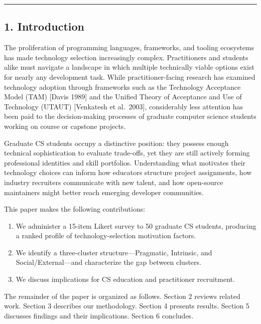 \documentclass[
]{article}
\providecommand{\tightlist}{%
  \setlength{\itemsep}{0pt}\setlength{\parskip}{0pt}}
\begin{document}
\begin{center}\rule{0.5\linewidth}{0.5pt}\end{center}

\subsection{1. Introduction}\label{introduction}

The proliferation of programming languages, frameworks, and tooling
ecosystems has made technology selection increasingly complex.
Practitioners and students alike must navigate a landscape in which
multiple technically viable options exist for nearly any development
task. While practitioner-facing research has examined technology
adoption through frameworks such as the Technology Acceptance Model
(TAM) {[}Davis 1989{]} and the Unified Theory of Acceptance and Use of
Technology (UTAUT) {[}Venkatesh et al.~2003{]}, considerably less
attention has been paid to the decision-making processes of graduate
computer science students working on course or capstone projects.

Graduate CS students occupy a distinctive position: they possess enough
technical sophistication to evaluate trade-offs, yet they are still
actively forming professional identities and skill portfolios.
Understanding what motivates their technology choices can inform how
educators structure project assignments, how industry recruiters
communicate with new talent, and how open-source maintainers might
better reach emerging developer communities.

This paper makes the following contributions:

\begin{enumerate}
\def\labelenumi{\arabic{enumi}.}
\tightlist
\item
  We administer a 15-item Likert survey to 50 graduate CS students,
  producing a ranked profile of technology-selection motivation factors.
\item
  We identify a three-cluster structure---Pragmatic, Intrinsic, and
  Social/External---and characterize the gap between clusters.
\item
  We discuss implications for CS education and practitioner recruitment.
\end{enumerate}

The remainder of the paper is organized as follows. Section 2 reviews
related work. Section 3 describes our methodology. Section 4 presents
results. Section 5 discusses findings and their implications. Section 6
concludes.
\end{document}
